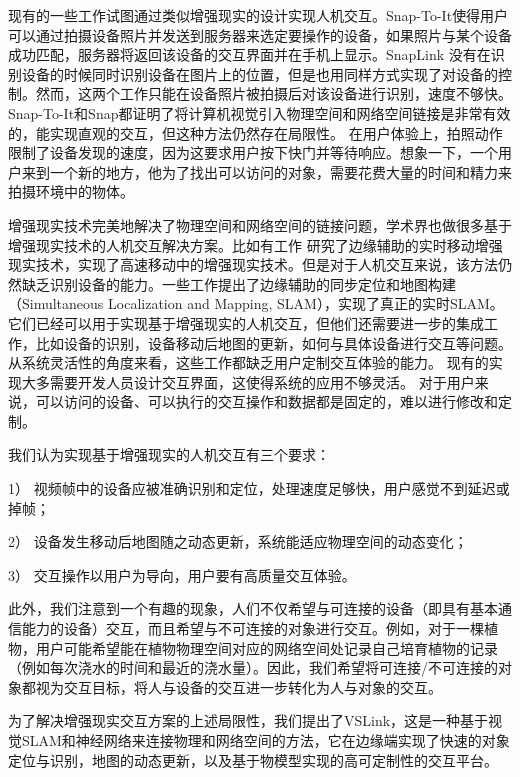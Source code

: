 现有的一些工作试图通过类似增强现实的设计实现人机交互\cite{de2016snap,chen2018snaplink}。Snap-To-It\cite{de2016snap}使得用户可以通过拍摄设备照片并发送到服务器来选定要操作的设备，如果照片与某个设备成功匹配，服务器将返回该设备的交互界面并在手机上显示。SnapLink\cite{chen2018snaplink} 没有在识别设备的时候同时识别设备在图片上的位置，但是也用同样方式实现了对设备的控制。然而，这两个工作只能在设备照片被拍摄后对该设备进行识别，速度不够快。Snap-To-It和Snap都证明了将计算机视觉引入物理空间和网络空间链接是非常有效的，能实现直观的交互，但这种方法仍然存在局限性。
在用户体验上，拍照动作限制了设备发现的速度，因为这要求用户按下快门并等待响应。想象一下，一个用户来到一个新的地方，他为了找出可以访问的对象，需要花费大量的时间和精力来拍摄环境中的物体。

增强现实技术完美地解决了物理空间和网络空间的链接问题，学术界也做很多基于增强现实技术的人机交互解决方案。比如有工作\cite{liu2019edge} 研究了边缘辅助的实时移动增强现实技术，实现了高速移动中的增强现实技术。但是对于人机交互来说，该方法仍然缺乏识别设备的能力。一些工作\cite{ben2020edge,xu2020edge,liu2021edgesharing}提出了边缘辅助的同步定位和地图构建（Simultaneous Localization and Mapping, SLAM），实现了真正的实时SLAM。它们已经可以用于实现基于增强现实的人机交互，但他们还需要进一步的集成工作，比如设备的识别，设备移动后地图的更新，如何与具体设备进行交互等问题。
从系统灵活性的角度来看，这些工作都缺乏用户定制交互体验的能力。
现有的实现大多需要开发人员设计交互界面，这使得系统的应用不够灵活。
对于用户来说，可以访问的设备、可以执行的交互操作和数据都是固定的，难以进行修改和定制。

我们认为实现基于增强现实的人机交互有三个要求：

1） 视频帧中的设备应被准确识别和定位，处理速度足够快，用户感觉不到延迟或掉帧；

2） 设备发生移动后地图随之动态更新，系统能适应物理空间的动态变化；

3） 交互操作以用户为导向，用户要有高质量交互体验。

此外，我们注意到一个有趣的现象，人们不仅希望与可连接的设备（即具有基本通信能力的设备）交互，而且希望与不可连接的对象进行交互。例如，对于一棵植物，用户可能希望能在植物物理空间对应的网络空间处记录自己培育植物的记录（例如每次浇水的时间和最近的浇水量）。因此，我们希望将可连接/不可连接的对象都视为交互目标，将人与设备的交互进一步转化为人与对象的交互。

为了解决增强现实交互方案的上述局限性，我们提出了VSLink，这是一种基于视觉SLAM和神经网络来连接物理和网络空间的方法，它在边缘端实现了快速的对象定位与识别，地图的动态更新，以及基于物模型实现的高可定制性的交互平台。

